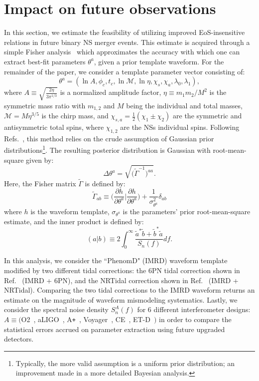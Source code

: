 \documentclass[prd,twocolumn,nofootinbib,superscriptaddress,amsmath,amssymb]{revtex4-1}
\begin{document}
\section{Impact on future observations}\label{sec:observations}
In this section, we estimate the feasibility of utilizing improved EoS-insensitive relations in future binary NS merger events.
This estimate is acquired through a simple Fisher analysis~\cite{Finn:Fisher,Cutler:Fisher} which approximates the accuracy with which one can extract best-fit parameters $\theta^a$, given a prior template waveform.
For the remainder of the paper, we consider a template parameter vector consisting of:
\begin{equation}\label{eq:template}
\theta^a=(\ln{A},\phi_c,t_c,\ln{\mathcal{M}},\ln{\mathcal{\eta}},\chi_s,\chi_a,\lambda_0, \lambda_1),
\end{equation}
where $A \equiv \sqrt{\frac{2 \eta}{3 \pi^{1/3}}}$ is a normalized amplitude factor, $\eta \equiv m_1 m_2/M^2$ is the symmetric mass ratio with $m_{1,2}$ and $M$ being the individual and total masses, $\mathcal{M}=M \eta^{3/5}$ is the chirp mass, and $\chi_{s,a}=\frac{1}{2}(\chi_1\pm\chi_2)$ are the symmetric and antisymmetric total spins, where $\chi_{1,2}$ are the NSs individual spins. 
Following Refs.~\cite{Cutler:Fisher,Berti:Fisher,Poisson:Fisher}, this method relies on the crude assumption of Gaussian prior distributions\footnote{Typically, the more valid assumption is a uniform prior distribution; an improvement made in a more detailed Bayesian analysis.}.
The resulting posterior distribution is Gaussian with root-mean-square given by:
\begin{equation}
\Delta \theta^a=\sqrt{\Big( \tilde{\Gamma}^{-1}\Big)^{aa}}.
\end{equation}
Here, the Fisher matrix $\tilde{\Gamma}$ is defined by:
\begin{equation}
\tilde{\Gamma}_{ab} \equiv \Big( \frac{\partial h}{\partial \theta^a} \Big| \frac{\partial h}{\partial \theta^a}\Big) + \frac{1}{\sigma_{\theta^a}^2} \delta_{ab}
\end{equation}
where $h$ is the waveform template, $\sigma_{\theta^a}$ is the parameters' prior root-mean-square estimate, and the inner product is defined by:
\begin{equation}
(a|b) \equiv 2 \int^{\infty}_0\frac{\tilde{a}^*\tilde{b}+\tilde{b}^*\tilde{a}}{S_n(f)}df.
\end{equation}

In this analysis, we consider the ``PhenomD" (IMRD) waveform template~\cite{PhenomDI,PhenomDII} modified by two different tidal corrections: the 6PN tidal correction shown in Ref.~\cite{Wade:tidalCorrections} (IMRD + 6PN), and the NRTidal correction shown in Ref.~\cite{Samajdar:NRTidal} (IMRD + NRTidal).
Comparing the two tidal corrections to the IMRD waveform returns an estimate on the magnitude of waveform mismodeling systematics.
Lastly, we consider the spectral noise density $S_n^A(f)$ for 6 different interferometer designs: $A \equiv ($O2~\cite{aLIGO}, aLIGO~\cite{aLIGO}, A\texttt{+}~\cite{Ap_Voyager_CE}, Voyager~\cite{Ap_Voyager_CE}, CE~\cite{ET}, ET-D~\cite{Ap_Voyager_CE}$)$ in order to compare the statistical errors accrued on parameter extraction using future upgraded detectors.
\end{document}
